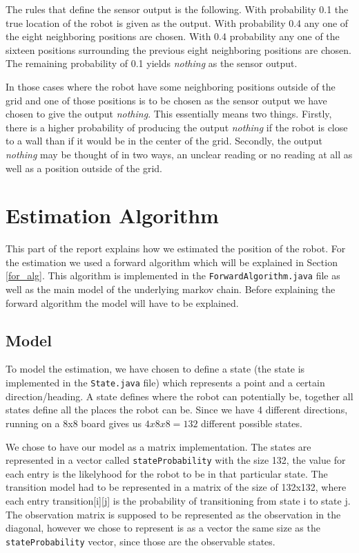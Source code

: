 \documentclass[a4paper]{article}
\begin{document}
The rules that define the sensor output is the following. With probability 0.1 the true location of the robot is given as the output. With probability 0.4 any one of the eight neighboring positions are chosen. With 0.4 probability any one of the sixteen positions surrounding the previous eight neighboring positions are chosen. The remaining probability of 0.1 yields \emph{nothing} as the sensor output.

In those cases where the robot have some neighboring positions outside of the grid and one of those positions is to be chosen as the sensor output we have chosen to give the output \emph{nothing}. This essentially means two things.  Firstly, there is a higher probability of producing the output \emph{nothing} if the robot is close to a wall than if it would be in the center of the grid. Secondly, the output \emph{nothing} may be thought of in two ways, an unclear reading or no reading at all as well as a position outside of the grid.




\section{Estimation Algorithm}
This part of the report explains how we estimated the position of the robot.
For the estimation we used a forward algorithm which will be explained in Section \ref{for_alg}. This algorithm is implemented in the \texttt{ForwardAlgorithm.java} file as well as the main model of the underlying markov chain. Before explaining the forward algorithm the model will have to be explained.

\subsection{Model}
To model the estimation, we have chosen to define a state (the state is implemented in the \texttt{State.java} file) which represents a point and a certain direction/heading. A state defines where the robot can potentially be, together all states define all the places the robot can be. Since we have 4 different directions, running on a 8x8 board gives us $4x8x8 = 132$ different possible states.

We chose to have our model as a matrix implementation. The states are represented in a vector called \texttt{stateProbability} with the size 132, the value for each entry is the likelyhood for the robot to be in that particular state. The transition model had to be represented in a matrix of the size of 132x132, where each entry transition[i][j] is the probability of transitioning from state i to state j. 
The observation matrix is supposed to be represented as the observation in the diagonal, however we chose to represent is as a vector the same size as the \texttt{stateProbability} vector, since those are the observable states.  
\end{document}
